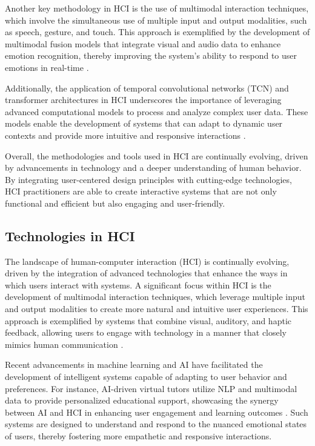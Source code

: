 Another key methodology in HCI is the use of multimodal interaction techniques, which involve the simultaneous use of multiple input and output modalities, such as speech, gesture, and touch. This approach is exemplified by the development of multimodal fusion models that integrate visual and audio data to enhance emotion recognition, thereby improving the system's ability to respond to user emotions in real-time \cite{zhou2023leveragingtcntransformereffective}.



Additionally, the application of temporal convolutional networks (TCN) and transformer architectures in HCI underscores the importance of leveraging advanced computational models to process and analyze complex user data. These models enable the development of systems that can adapt to dynamic user contexts and provide more intuitive and responsive interactions \cite{zhou2023leveragingtcntransformereffective}.



Overall, the methodologies and tools used in HCI are continually evolving, driven by advancements in technology and a deeper understanding of human behavior. By integrating user-centered design principles with cutting-edge technologies, HCI practitioners are able to create interactive systems that are not only functional and efficient but also engaging and user-friendly.



\subsection{Technologies in HCI} \label{subsec:Technologies in HCI}

The landscape of human-computer interaction (HCI) is continually evolving, driven by the integration of advanced technologies that enhance the ways in which users interact with systems. A significant focus within HCI is the development of multimodal interaction techniques, which leverage multiple input and output modalities to create more natural and intuitive user experiences. This approach is exemplified by systems that combine visual, auditory, and haptic feedback, allowing users to engage with technology in a manner that closely mimics human communication \cite{zhou2023leveragingtcntransformereffective}.



Recent advancements in machine learning and AI have facilitated the development of intelligent systems capable of adapting to user behavior and preferences. For instance, AI-driven virtual tutors utilize NLP and multimodal data to provide personalized educational support, showcasing the synergy between AI and HCI in enhancing user engagement and learning outcomes \cite{thapliyal2022crossmodal3600massivelymultilingualmultimodal}. Such systems are designed to understand and respond to the nuanced emotional states of users, thereby fostering more empathetic and responsive interactions.



